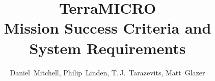 \documentclass[conf]{new-aiaa}
\title{TerraMICRO \\ Mission Success Criteria and System Requirements}
\author{Daniel~Mitchell, Philip~Linden, T.\,J.~Tarazevits, Matt~Glazer}
\affil{\github{TerraHAB/TerraMICRO}}
\begin{document}
\maketitle%

\newcommand\subdir{tex} %




% 
% 

%     
\end{document}
